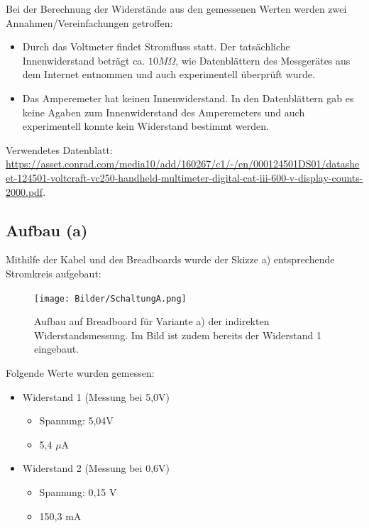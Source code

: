 \documentclass[
  9pt,
]{article}
\begin{document}
Bei der Berechnung der Widerstände aus den gemessenen Werten werden zwei
Annahmen/Vereinfachungen getroffen:

\begin{itemize}
  \item Durch das Voltmeter findet Stromfluss statt. Der tatsächliche Innenwiderstand beträgt ca. $10M\Omega$, wie Datenblättern des Messgerätes aus dem Internet entnommen und auch experimentell überprüft wurde.
  \item Das Amperemeter hat keinen Innenwiderstand. In den Datenblättern gab es keine Agaben zum Innenwiderstand des Amperemeters und auch experimentell konnte kein Widerstand bestimmt werden.
\end{itemize}

Verwendetes Datenblatt:
\url{https://asset.conrad.com/media10/add/160267/c1/-/en/000124501DS01/datasheet-124501-voltcraft-vc250-handheld-multimeter-digital-cat-iii-600-v-display-counts-2000.pdf}.

\hypertarget{aufbau-a}{%
\subsection{Aufbau (a)}\label{aufbau-a}}

Mithilfe der Kabel und des Breadboards wurde der Skizze a) entsprechende
Stromkreis aufgebaut:

\begin{figure}
\centering
\texttt{[image: Bilder/SchaltungA.png]}
\caption{Aufbau auf Breadboard für Variante a) der indirekten
Widerstandsmessung. Im Bild ist zudem bereits der Widerstand 1
eingebaut.}
\end{figure}

\newpage

Folgende Werte wurden gemessen:

\begin{itemize}
\item {Widerstand 1 (Messung bei 5,0V)}
\begin{itemize}
\item {Spannung: 5,04V}
\item {5,4 $\mu$A}
\end{itemize}
\item {Widerstand 2 (Messung bei 0,6V)}
\begin{itemize}
\item {Spannung: 0,15 V}
\item {150,3 mA}
\end{itemize}
\end{itemize}
\end{document}
